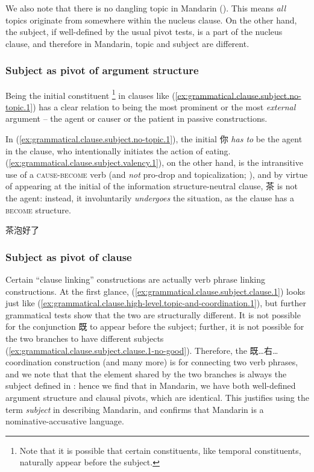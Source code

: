 \documentclass[UTF8, a4paper, oneside, scheme=plain, 12pt]{ctexrep}
\newcommand*{\term}[1]{\emph{#1}}
\newcommand*{\category}[1]{\textsc{#1}}
\begin{document}
We also note that there is no dangling topic in Mandarin ().
This means \emph{all} topics originate from somewhere within the nucleus clause.
On the other hand, the subject, if well-defined by the usual pivot tests, is a part of the nucleus clause,
and therefore in Mandarin, topic and subject are different.

\subsubsection{Subject as pivot of argument structure}\label{sec:grammatical.clause.subject.argument}

Being the initial constituent%
\footnote{
    Note that it is possible that certain constituents, like temporal constituents,
    naturally appear before the subject.
}
in clauses like (\ref{ex:grammatical.clause.subject.no-topic.1}) 
has a clear relation to being the most prominent or the most \emph{external} argument
-- the agent or causer or the patient in passive constructions.

In (\ref{ex:grammatical.clause.subject.no-topic.1}),
the initial 你 \emph{has to} be the agent in the clause,
who intentionally initiates the action of eating.
(\ref{ex:grammatical.clause.subject.valency.1}),
on the other hand, is the intransitive use of a \category{cause}-\category{become} verb
(and \emph{not} pro-drop and topicalization; ),
and by virtue of appearing at the initial of
the information structure-neutral clause,
茶 is not the agent: instead, it involuntarily \emph{undergoes} the situation,
as the clause has a \category{become} structure.

\begin{exe}
    \ex\label{ex:grammatical.clause.subject.valency.1} 茶泡好了
\end{exe}

\subsubsection{Subject as pivot of clause}\label{sec:grammatical.clause.subject.clause}

Certain ``clause linking'' constructions are actually verb phrase linking constructions.
At the first glance, (\ref{ex:grammatical.clause.subject.clause.1}) looks just like (\ref{ex:grammatical.clause.high-level.topic-and-coordination.1}),
but further grammatical tests show that the two are structurally different.
It is not possible for the conjunction 既 to appear before the subject;
further, it is not possible for the two branches to have different subjects
(\ref{ex:grammatical.clause.subject.clause.1-no-good}).
Therefore, the 既…右… coordination construction (and many more) is for connecting two verb phrases,
and we note that that the element shared by the two branches is
always the subject defined in :
hence we find that in Mandarin,
we have both well-defined argument structure and clausal pivots,
which are identical.
This justifies using the term \term{subject} in describing Mandarin,
and confirms that Mandarin is a nominative-accusative language.
\end{document}
